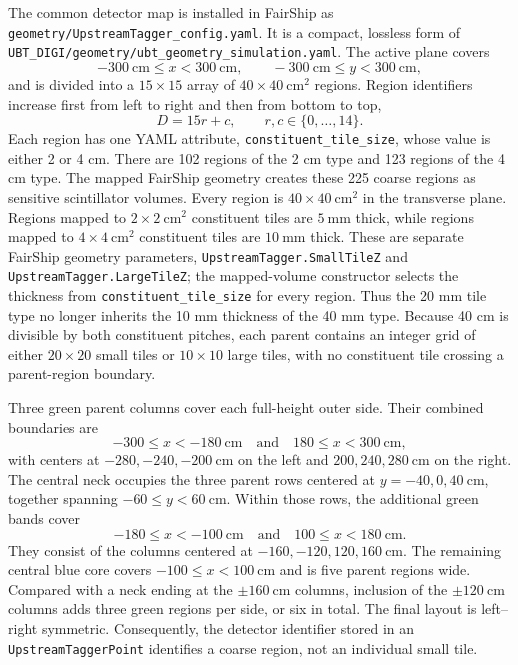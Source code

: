 The common detector map is installed in FairShip as
\texttt{geometry/UpstreamTagger\_config.yaml}.  It is a compact, lossless form
of \texttt{UBT\_DIGI/geometry/ubt\_geometry\_simulation.yaml}.  The active
plane covers
\[
  -300~\mathrm{cm} \leq x < 300~\mathrm{cm}, \qquad
  -300~\mathrm{cm} \leq y < 300~\mathrm{cm},
\]
and is divided into a $15\times15$ array of $40\times40~\mathrm{cm^2}$
regions.  Region identifiers increase first from left to right and then from
bottom to top,
\[
  D = 15r+c, \qquad r,c\in\{0,\ldots,14\}.
\]
Each region has one YAML attribute,
\texttt{constituent\_tile\_size}, whose value is either 2 or 4 cm.  There are
102 regions of the 2 cm type and 123 regions of the 4 cm type.  The mapped
FairShip geometry creates these 225 coarse regions as sensitive scintillator
volumes.  Every region is $40\times40~\mathrm{cm^2}$ in the transverse plane.
Regions mapped to $2\times2~\mathrm{cm^2}$ constituent tiles are
$5~\mathrm{mm}$ thick, while regions mapped to
$4\times4~\mathrm{cm^2}$ constituent tiles are $10~\mathrm{mm}$ thick.
These are separate FairShip geometry parameters,
\texttt{UpstreamTagger.SmallTileZ} and
\texttt{UpstreamTagger.LargeTileZ}; the mapped-volume constructor selects the
thickness from \texttt{constituent\_tile\_size} for every region.  Thus the
20 mm tile type no longer inherits the 10 mm thickness of the 40 mm type.
Because 40 cm is divisible by both constituent pitches, each parent contains
an integer grid of either \(20\times20\) small tiles or \(10\times10\) large
tiles, with no constituent tile crossing a parent-region boundary.

Three green parent columns cover each full-height outer side.  Their combined
boundaries are
\[
  -300 \leq x < -180~\mathrm{cm}
  \quad\text{and}\quad
  180 \leq x < 300~\mathrm{cm},
\]
with centers at \(-280,-240,-200~\mathrm{cm}\) on the left and
\(200,240,280~\mathrm{cm}\) on the right.  The central neck occupies the
three parent rows centered at \(y=-40,0,40~\mathrm{cm}\), together spanning
\(-60\leq y<60~\mathrm{cm}\).  Within those rows, the additional green bands
cover
\[
  -180 \leq x < -100~\mathrm{cm}
  \quad\text{and}\quad
  100 \leq x < 180~\mathrm{cm}.
\]
They consist of the columns centered at
\(-160,-120,120,160~\mathrm{cm}\).  The remaining central blue core covers
\(-100\leq x<100~\mathrm{cm}\) and is five parent regions wide.  Compared
with a neck ending at the \(\pm160~\mathrm{cm}\) columns, inclusion of the
\(\pm120~\mathrm{cm}\) columns adds three green regions per side, or six in
total.  The final layout is left--right symmetric.
Consequently, the detector identifier stored in an
\texttt{UpstreamTaggerPoint} identifies a coarse region, not an individual
small tile.

